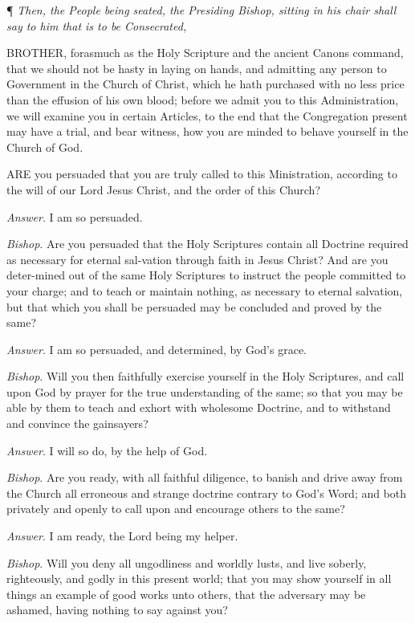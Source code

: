 ¶
\emph{Then, the People being seated, the Presiding Bishop, sitting in his
chair shall say to him that is to be Consecrated,}

BROTHER,
forasmuch as the Holy Scripture and the ancient Canons command, that we
should not be hasty in laying on hands, and admitting any person to Government
in the Church of Christ, which he hath purchased with no less price than
the effusion of his own blood; before we admit you to this Administration,
we will examine you in certain Articles, to the end that the Congregation
present may have a trial, and bear witness, how you are minded to behave
yourself in the Church of God.

ARE
you persuaded that you are truly called to this Ministration, according
to the will of our Lord Jesus Christ, and the order of this Church?

\emph{Answer}. I am so persuaded.

\emph{Bishop}. Are you persuaded that the Holy
Scriptures contain all Doctrine required as necessary for eternal sal-vation
through faith in Jesus Christ? And are you deter-mined out of the same
Holy Scriptures to instruct the people committed to your charge; and to
teach or maintain nothing, as necessary to eternal salvation, but that
which you shall be persuaded may be concluded and proved by the same?

\emph{Answer}. I am so persuaded, and determined,
by God's grace.

\emph{Bishop}. Will you then faithfully exercise
yourself in the Holy Scriptures, and call upon God by prayer for the true
understanding of the same; so that you may be able by them to teach and
exhort with wholesome Doctrine, and to withstand and convince the gainsayers?

\emph{Answer}. I will so do, by the help of
God.

\emph{Bishop}. Are you ready, with all faithful diligence,
to banish and drive away from the Church all erroneous and strange doctrine
contrary to God's Word; and both privately and openly to call upon and
encourage others to the same?

\emph{Answer}. I am ready, the Lord being my helper.

\emph{Bishop}. Will you deny all ungodliness
and worldly lusts, and live soberly, righteously, and godly in this present
world; that you may show yourself in all things an example of good works
unto others, that the adversary may be ashamed, having nothing to say
against you?

